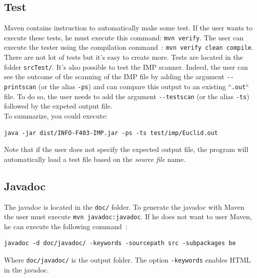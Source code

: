 \documentclass[a4paper,11pt]{article}
\begin{document}
  \subsection{Test}
    \label{subsec:test}
    Maven contains instruction to automatically make some test.  If the user wants to execute these tests, he must execute this command: \verb|mvn verify|. The user can execute the tester using the compilation command~: \verb|mvn verify clean compile|.\\
    There are not lot of tests but it's easy to create more. Tests are located in the folder \verb|srcTest/|. 
    It's also possible to test the IMP scanner. Indeed, the user can see the outcome of the scanning of the IMP file by adding the argument \verb|--printscan| (or the alias \verb|-ps|) and can compare this output to an existing ``\verb|.out|`` file. To do so, the user needs to add the argument \verb|--testscan| (or the alias \verb|-ts|) followed by the expeted output file.\\
    To summarize, you could execute:
    \begin{verbatim}
java -jar dist/INFO-F403-IMP.jar -ps -ts test/imp/Euclid.out\end{verbatim}
    Note that if the user does not specify the expected output file, the program will automatically load a test file based on the \textit{source file} name.
    
  \subsection{Javadoc}
    The javadoc is located in the \verb|doc/| folder. To generate the javadoc with Maven the user must execute \verb|mvn javadoc:javadoc|.  If he does not want to user Maven, he can execute the following command~:
    \begin{verbatim}
javadoc -d doc/javadoc/ -keywords -sourcepath src -subpackages be
    \end{verbatim}
    Where \verb|doc/javadoc/| is the output folder. The option \verb|-keywords| enables HTML in the javadoc.
    
\end{document}
